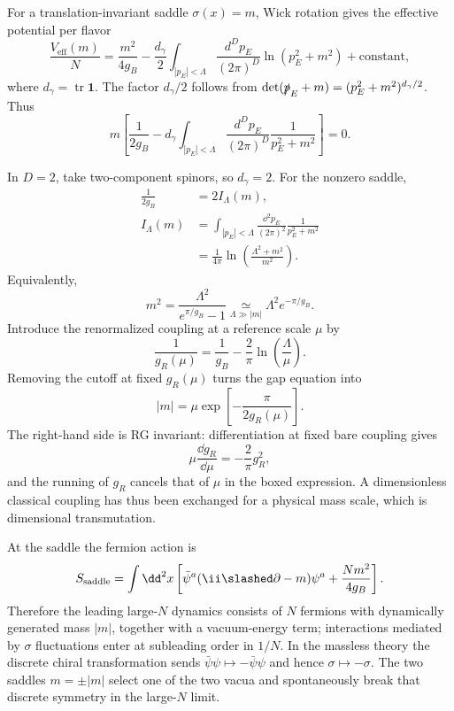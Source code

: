 \begin{enumerate}
\begin{enumerate}
    For a translation-invariant saddle \(\sigma(x)=m\), Wick rotation gives
    the effective potential per flavor
    \[
      \frac{V_{\mathrm{eff}}(m)}{N}
      =\frac{m^2}{4g_B}
       -\frac{d_\gamma}{2}
        \int_{|p_E|<\Lambda}\frac{d^Dp_E}{(2\pi)^D}
          \ln(p_E^2+m^2)+\text{constant},
    \]
    where \(d_\gamma=\operatorname{tr}\mathbf1\).  The factor
    \(d_\gamma/2\) follows from
    \(\det(\slashed p_E+m)=(p_E^2+m^2)^{d_\gamma/2}\).  Thus
    \[
      m\left[
        \frac{1}{2g_B}
        -d_\gamma\int_{|p_E|<\Lambda}
          \frac{d^Dp_E}{(2\pi)^D}\frac{1}{p_E^2+m^2}
      \right]=0.
    \]

    In \(D=2\), take two-component spinors, so \(d_\gamma=2\).  For the
    nonzero saddle,
    \[
      \begin{aligned}
        \frac{1}{2g_B}&=2I_\Lambda(m),\\
        I_\Lambda(m)&=\int_{|p_E|<\Lambda}
          \frac{\dd^2p_E}{(2\pi)^2}\frac{1}{p_E^2+m^2}\\
        &=\frac{1}{4\pi}\ln\left(
          \frac{\Lambda^2+m^2}{m^2}\right).
      \end{aligned}
    \]
    Equivalently,
    \[
      m^2=\frac{\Lambda^2}{e^{\pi/g_B}-1}
      \underset{\Lambda\gg|m|}{\simeq}
      \Lambda^2e^{-\pi/g_B}.
    \]
    Introduce the renormalized coupling at a reference scale \(\mu\) by
    \[
      \frac{1}{g_R(\mu)}
        =\frac{1}{g_B}-\frac{2}{\pi}\ln\left(\frac{\Lambda}{\mu}\right).
    \]
    Removing the cutoff at fixed \(g_R(\mu)\) turns the gap equation into
    \[
      \boxed{|m|=\mu
        \exp\left[-\frac{\pi}{2g_R(\mu)}\right].}
    \]
    The right-hand side is RG invariant: differentiation at fixed bare
    coupling gives
    \[
      \mu\frac{\dd g_R}{\dd\mu}=-\frac{2}{\pi}g_R^2,
    \]
    and the running of \(g_R\) cancels that of \(\mu\) in the boxed
    expression.  A dimensionless classical coupling has thus been exchanged
    for a physical mass scale, which is dimensional transmutation.

    At the saddle the fermion action is
    \[
      S_{\mathrm{saddle}}=\int \dd^2x\left[
        \bar\psi^a(\ii\slashed\partial-m)\psi^a
        +\frac{Nm^2}{4g_B}
      \right].
    \]
    Therefore the leading large-\(N\) dynamics consists of \(N\) fermions
    with dynamically generated mass \(|m|\), together with a vacuum-energy
    term; interactions mediated by \(\sigma\) fluctuations enter at
    subleading order in \(1/N\).  In the massless theory the discrete chiral
    transformation sends \(\bar\psi\psi\mapsto-\bar\psi\psi\) and hence
    \(\sigma\mapsto-\sigma\).  The two saddles \(m=\pm|m|\) select one of
    the two vacua and spontaneously break that discrete symmetry in the
    large-\(N\) limit.
  \end{enumerate}


\end{enumerate}
